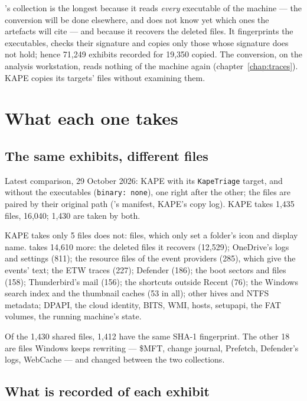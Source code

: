 \documentclass[11pt,a4paper,oneside]{report}
\begin{document}
\wac{}'s collection is the longest because it reads \emph{every} executable of
the machine --- the conversion will be done elsewhere, and does not know yet
which ones the artefacts will cite --- and because it recovers the deleted
files. It fingerprints the executables, checks their signature and copies only
those whose signature does not hold; hence 71,249 exhibits recorded for 19,350
copied. The conversion, on the analysis workstation, reads nothing of the
machine again (chapter~\ref{chap:traces}). KAPE copies its targets' files
without examining them.

\chapter{What each one takes}\label{chap:taken}

\section{The same exhibits, different files}

Latest comparison, 29 October 2026: KAPE with its \texttt{KapeTriage}
target, and \wac{} without the executables (\texttt{binary: none}), one right
after the other; the files are paired by their original path (\wac{}'s
manifest, KAPE's copy log). KAPE takes 1,435 files, \wac{} 16,040; 1,430 are
taken by both.

KAPE takes only 5 files \wac{} does not:  files, which only
set a folder's icon and display name. \wac{} takes 14,610 more: the deleted
files it recovers (12,529); OneDrive's logs and settings (811); the resource
files of the event providers (285), which give the events' text; the ETW
traces (227); Defender (186); the boot sectors and files (158); Thunderbird's
mail (156); the shortcuts outside Recent (76); the Windows search index and
the thumbnail caches (53 in all); other hives and NTFS metadata; DPAPI, the
cloud identity, BITS, WMI, hosts, setupapi, the FAT volumes, the running
machine's state.

Of the 1,430 shared files, 1,412 have the same SHA-1 fingerprint. The other 18
are files Windows keeps rewriting --- \$MFT, change journal, Prefetch,
Defender's logs, WebCache --- and changed between the two collections.

\section{What is recorded of each exhibit}
\end{document}
